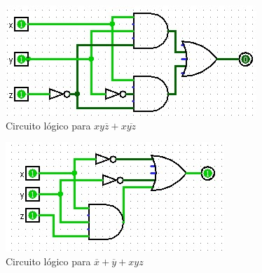 \begin{figure}[h!]
    \centering
    \includegraphics[width=\textwidth]{recursos/Ejercicio2/circuito_c.png   }
    \caption{Circuito lógico para $xy\overline{z} + x\overline{yz}$}
\end{figure}

\begin{figure}[h!]
    \centering
    \includegraphics[width=\textwidth]{recursos/Ejercicio2/circuito_d.png}
    \caption{Circuito lógico para $\overline{x} + \overline{y} + xyz$}
\end{figure}



